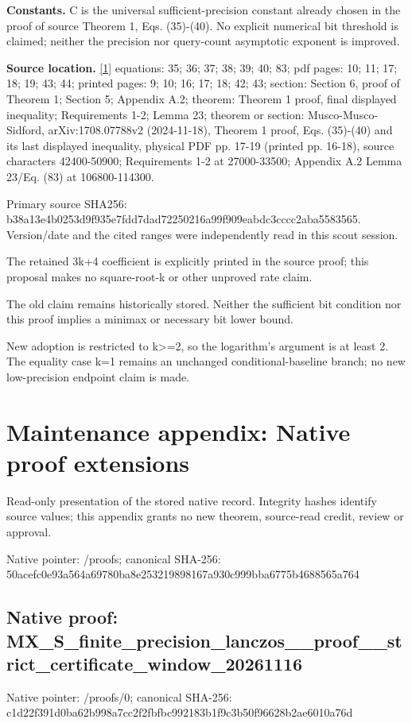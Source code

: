 \documentclass[10pt,a4paper]{article}
\begin{document}
\textbf{Constants.} C is the universal sufficient-precision constant already chosen in the proof of source Theorem 1, Eqs. (35)-(40). No explicit numerical bit threshold is claimed; neither the precision nor query-count asymptotic exponent is improved.

\textbf{Source location.} \href{https://arxiv.org/pdf/1708.07788v2}{[1]} equations: 35; 36; 37; 38; 39; 40; 83; pdf pages: 10; 11; 17; 18; 19; 43; 44; printed pages: 9; 10; 16; 17; 18; 42; 43; section: Section 6, proof of Theorem 1; Section 5; Appendix A.2; theorem: Theorem 1 proof, final displayed inequality; Requirements 1-2; Lemma 23; theorem or section: Musco-Musco-Sidford, arXiv:1708.07788v2 (2024-11-18), Theorem 1 proof, Eqs. (35)-(40) and its last displayed inequality, physical PDF pp. 17-19 (printed pp. 16-18), source characters 42400-50900; Requirements 1-2 at 27000-33500; Appendix A.2 Lemma 23/Eq. (83) at 106800-114300.

Primary source SHA256: b38a13e4b0253d9f935e7fdd7dad72250216a99f909eabdc3cccc2aba5583565. Version/date and the cited ranges were independently read in this scout session.

The retained 3k+4 coefficient is explicitly printed in the source proof; this proposal makes no square-root-k or other unproved rate claim.

The old claim remains historically stored. Neither the sufficient bit condition nor this proof implies a minimax or necessary bit lower bound.

New adoption is restricted to k>=2, so the logarithm's argument is at least 2. The equality case k=1 remains an unchanged conditional-baseline branch; no new low-precision endpoint claim is made.

\section{Maintenance appendix: Native proof extensions}
Read-only presentation of the stored native record. Integrity hashes identify source values; this appendix grants no new theorem, source-read credit, review or approval.

Native pointer: /proofs; canonical SHA-256: 50acefc0e93a564a69780ba8e253219898167a930c999bba6775b4688565a764

\subsection{Native proof: MX\_\allowbreak{}S\_\allowbreak{}finite\_\allowbreak{}precision\_\allowbreak{}lanczos\_\allowbreak{}\_\allowbreak{}proof\_\allowbreak{}\_\allowbreak{}strict\_\allowbreak{}certificate\_\allowbreak{}window\_\allowbreak{}20261116}
Native pointer: /proofs/0; canonical SHA-256: c1d22f391d0ba62b998a7cc2f2fbfbc992183b1f9c3b50f96628b2ae6010a76d
\end{document}
